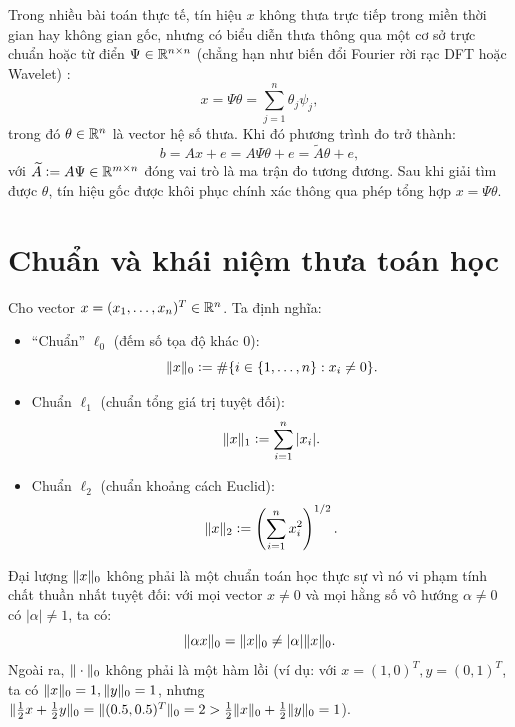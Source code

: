 Trong nhiều bài toán thực tế, tín hiệu $x$ không thưa trực tiếp trong miền thời gian hay không gian gốc, nhưng có biểu diễn thưa thông qua một cơ sở trực chuẩn hoặc từ điển $\Psi \in \mathbb{R}^{n \times n}$ (chẳng hạn như biến đổi Fourier rời rạc DFT hoặc Wavelet) \cite{foucart2013mathematical, nguyen2016khoiphuc}:
\begin{equation}
    x = \Psi \theta = \sum_{j=1}^n \theta_j \psi_j,
\end{equation}
trong đó $\theta \in \mathbb{R}^n$ là vector hệ số thưa. Khi đó phương trình đo trở thành:
\begin{equation}
    b = A x + e = A \Psi \theta + e = \widetilde{A} \theta + e,
\end{equation}
với $\widetilde{A} \mathrel{\mathop:}= A \Psi \in \mathbb{R}^{m \times n}$ đóng vai trò là ma trận đo tương đương. Sau khi giải tìm được $\theta$, tín hiệu gốc được khôi phục chính xác thông qua phép tổng hợp $x = \Psi \theta$.

\section{Chuẩn và khái niệm thưa toán học}
\begin{definition}
Cho vector $x = (x_1, \dots, x_n)^T \in \mathbb{R}^n$. Ta định nghĩa:
\begin{itemize}
    \item ``Chuẩn'' $\ell_0$ (đếm số tọa độ khác 0):
    \[
    \|x\|_0 \mathrel{\mathop:}= \#\{i \in \{1, \dots, n\} : x_i \ne 0\}.
    \]
    \item Chuẩn $\ell_1$ (chuẩn tổng giá trị tuyệt đối):
    \[
    \|x\|_1 \mathrel{\mathop:}= \sum_{i=1}^n |x_i|.
    \]
    \item Chuẩn $\ell_2$ (chuẩn khoảng cách Euclid):
    \[
    \|x\|_2 \mathrel{\mathop:}= \left( \sum_{i=1}^n x_i^2 \right)^{1/2}.
    \]
\end{itemize}
\end{definition}

\begin{remark}
Đại lượng $\|x\|_0$ không phải là một chuẩn toán học thực sự vì nó vi phạm tính chất thuần nhất tuyệt đối: với mọi vector $x \ne 0$ và mọi hằng số vô hướng $\alpha \ne 0$ có $|\alpha| \ne 1$, ta có:
\[
\|\alpha x\|_0 = \|x\|_0 \ne |\alpha| \|x\|_0.
\]
Ngoài ra, $\|\cdot\|_0$ không phải là một hàm lồi (ví dụ: với $x = (1, 0)^T, y = (0, 1)^T$, ta có $\|x\|_0 = 1, \|y\|_0 = 1$, nhưng $\|\frac{1}{2}x + \frac{1}{2}y\|_0 = \|(0.5, 0.5)^T\|_0 = 2 > \frac{1}{2}\|x\|_0 + \frac{1}{2}\|y\|_0 = 1$).
\end{remark}

